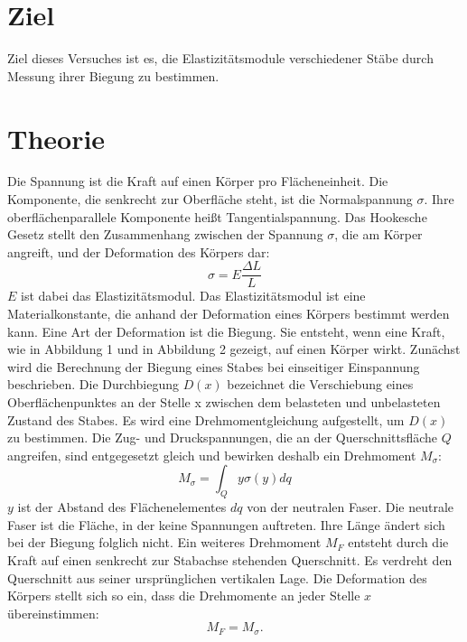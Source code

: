 

\section{Ziel}
Ziel dieses Versuches ist es, die Elastizitätsmodule
verschiedener Stäbe durch Messung ihrer Biegung
zu bestimmen.
\section{Theorie}
Die Spannung ist die Kraft auf einen Körper pro Flächeneinheit.
Die Komponente, die senkrecht zur Oberfläche steht,
ist die Normalspannung $\sigma$. Ihre oberflächenparallele
Komponente heißt Tangentialspannung.
Das Hookesche Gesetz stellt den Zusammenhang zwischen
der Spannung $\sigma$, die am Körper angreift, und der
Deformation des Körpers dar:
\begin{equation}
\sigma = E \frac{\Delta L}{L}
\label{eqn:Hooke}
\end{equation}
$E$ ist dabei das Elastizitätsmodul.
Das Elastizitätsmodul ist eine Materialkonstante, die
anhand der Deformation eines Körpers bestimmt werden kann.
Eine Art der Deformation ist die Biegung. Sie entsteht, wenn
eine Kraft, wie in Abbildung 1 und in Abbildung 2 gezeigt, auf einen Körper wirkt. %
Zunächst wird die Berechnung der Biegung eines Stabes bei einseitiger
Einspannung beschrieben. %
Die Durchbiegung $D(x)$ bezeichnet die Verschiebung eines Oberflächenpunktes
an der Stelle x zwischen dem belasteten und unbelasteten Zustand des Stabes.
Es wird eine Drehmomentgleichung aufgestellt, um $D(x)$ zu bestimmen.
Die Zug- und Druckspannungen, die an der Querschnittsfläche $Q$ angreifen,
sind entgegesetzt gleich und bewirken deshalb ein Drehmoment $M_{\sigma}$:
\begin{equation}
M_{\sigma} = \int_{Q} y \sigma(y) dq
\end{equation}
$y$ ist der Abstand des Flächenelementes $dq$ von der neutralen
Faser. Die neutrale Faser ist die Fläche, in der keine Spannungen
auftreten. Ihre Länge ändert sich bei der Biegung folglich nicht.
Ein weiteres Drehmoment $M_{F}$ entsteht durch die Kraft auf einen senkrecht
zur Stabachse stehenden Querschnitt. Es verdreht den Querschnitt aus 
seiner ursprünglichen vertikalen Lage.
Die Deformation des Körpers stellt sich so ein, dass die Drehmomente an
jeder Stelle $x$ übereinstimmen:
\begin{equation}
M_{F} = M_{\sigma}.
\end{equation}

